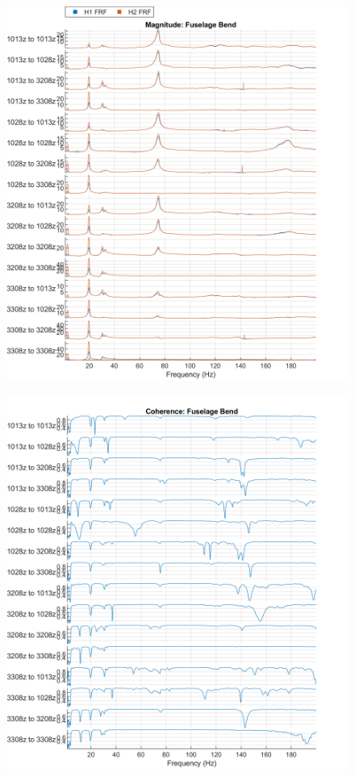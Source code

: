 \begin{figure}[H]
    \centering
    \includegraphics{figs/GVT/mag_Fuselage Bend.png}
    \label{fig:mag_fuseBend}
\end{figure}
\begin{figure}[H]
    \centering
    \includegraphics{figs/GVT/coh_Fuselage Bend.png}
    \label{fig:coh_fuseBend}
\end{figure}


